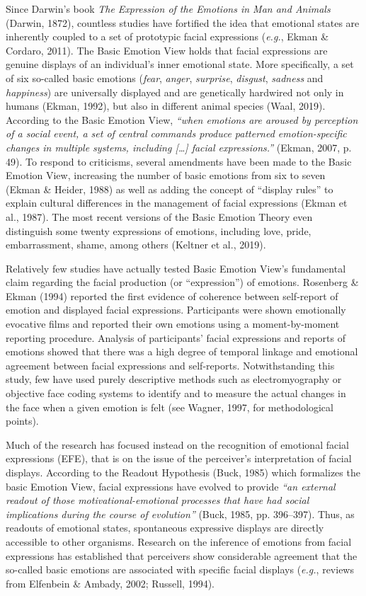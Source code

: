 \documentclass[
  english,
  man]{apa7}
\begin{document}
Since Darwin's book \emph{The Expression of the Emotions in Man and Animals} (Darwin, 1872), countless studies have fortified the idea that emotional states are inherently coupled to a set of prototypic facial expressions (\emph{e.g.}, Ekman \& Cordaro, 2011). The Basic Emotion View holds that facial expressions are genuine displays of an individual's inner emotional state. More specifically, a set of six so-called basic emotions (\emph{fear}, \emph{anger}, \emph{surprise}, \emph{disgust}, \emph{sadness} and \emph{happiness}) are universally displayed and are genetically hardwired not only in humans (Ekman, 1992), but also in different animal species (Waal, 2019). According to the Basic Emotion View, \emph{``when emotions are aroused by perception of a social event, a set of central commands produce patterned emotion-specific changes in multiple systems, including {[}\ldots{]} facial expressions.''} (Ekman, 2007, p. 49). To respond to criticisms, several amendments have been made to the Basic Emotion View, increasing the number of basic emotions from six to seven (Ekman \& Heider, 1988) as well as adding the concept of ``display rules'' to explain cultural differences in the management of facial expressions (Ekman et al., 1987). The most recent versions of the Basic Emotion Theory even distinguish some twenty expressions of emotions, including love, pride, embarrassment, shame, among others (Keltner et al., 2019).

Relatively few studies have actually tested Basic Emotion View's fundamental claim regarding the facial production (or ``expression'') of emotions. Rosenberg \& Ekman (1994) reported the first evidence of coherence between self-report of emotion and displayed facial expressions. Participants were shown emotionally evocative films and reported their own emotions using a moment-by-moment reporting procedure. Analysis of participants' facial expressions and reports of emotions showed that there was a high degree of temporal linkage and emotional agreement between facial expressions and self-reports. Notwithstanding this study, few have used purely descriptive methods such as electromyography or objective face coding systems to identify and to measure the actual changes in the face when a given emotion is felt (see Wagner, 1997, for methodological points).

Much of the research has focused instead on the recognition of emotional facial expressions (EFE), that is on the issue of the perceiver's interpretation of facial displays. According to the Readout Hypothesis (Buck, 1985) which formalizes the basic Emotion View, facial expressions have evolved to provide \emph{``an external readout of those motivational-emotional processes that have had social implications during the course of evolution''} (Buck, 1985, pp. 396--397). Thus, as readouts of emotional states, spontaneous expressive displays are directly accessible to other organisms. Research on the inference of emotions from facial expressions has established that perceivers show considerable agreement that the so-called basic emotions are associated with specific facial displays (\emph{e.g.}, reviews from Elfenbein \& Ambady, 2002; Russell, 1994).
\end{document}
